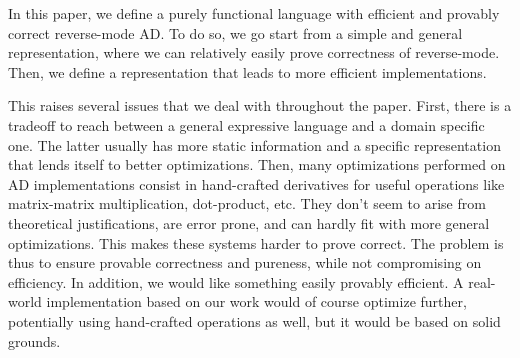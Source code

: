



In this paper, we define a purely functional language with efficient and provably correct reverse-mode AD.
To do so, we go start from a simple and general representation, where we can relatively easily prove correctness of reverse-mode.
Then, we define a representation that leads to more efficient implementations.

This raises several issues that we deal with throughout the paper. First, there is a tradeoff to reach between a general expressive language and a domain specific one. The latter usually has more static information and a specific representation that lends itself to better optimizations.
Then, many optimizations performed on AD implementations consist in hand-crafted derivatives for useful operations like matrix-matrix multiplication, dot-product, etc.
They don't seem to arise from theoretical justifications, are error prone, and can hardly fit with more general optimizations.
This makes these systems harder to prove correct. The problem is thus to ensure provable correctness and pureness, while not compromising on efficiency. In addition, we would like something easily provably efficient. 
A real-world implementation based on our work would of course optimize further, potentially using hand-crafted operations as well, but it would be based on solid grounds.


